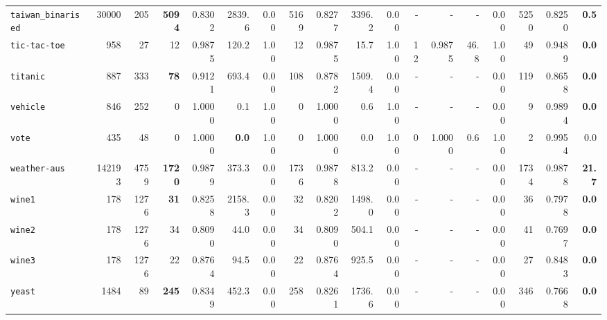 \begin{tabular}{lccrrrrrrrrrrrrrrr}
\texttt{taiwan\_binarised} & \multicolumn{1}{r}{30000} & \multicolumn{1}{r}{205}  & \textbf{5094} & 0.8302 & 2839.6 & 0.00 & 5169 & 0.8277 & 3396.2 & 0.00 & - & - & - & 0.00 & 5250 & 0.8250 & \textbf{0.5}\\
\texttt{tic-tac-toe} & \multicolumn{1}{r}{958} & \multicolumn{1}{r}{27}  & 12 & 0.9875 & 120.2 & 1.00 & 12 & 0.9875 & 15.7 & 1.00 & 12 & 0.9875 & 46.8 & 1.00 & 49 & 0.9489 & \textbf{0.0}\\
\texttt{titanic} & \multicolumn{1}{r}{887} & \multicolumn{1}{r}{333}  & \textbf{78} & 0.9121 & 693.4 & 0.00 & 108 & 0.8782 & 1509.4 & 0.00 & - & - & - & 0.00 & 119 & 0.8658 & \textbf{0.0}\\
\texttt{vehicle} & \multicolumn{1}{r}{846} & \multicolumn{1}{r}{252}  & 0 & 1.0000 & 0.1 & 1.00 & 0 & 1.0000 & 0.6 & 1.00 & - & - & - & 0.00 & 9 & 0.9894 & \textbf{0.0}\\
\texttt{vote} & \multicolumn{1}{r}{435} & \multicolumn{1}{r}{48}  & 0 & 1.0000 & \textbf{0.0} & 1.00 & 0 & 1.0000 & 0.0 & 1.00 & 0 & 1.0000 & 0.6 & 1.00 & 2 & 0.9954 & 0.0\\
\texttt{weather-aus} & \multicolumn{1}{r}{142193} & \multicolumn{1}{r}{4759}  & \textbf{1720} & 0.9879 & 373.3 & 0.00 & 1736 & 0.9878 & 813.2 & 0.00 & - & - & - & 0.00 & 1734 & 0.9878 & \textbf{21.7}\\
\texttt{wine1} & \multicolumn{1}{r}{178} & \multicolumn{1}{r}{1276}  & \textbf{31} & 0.8258 & 2158.3 & 0.00 & 32 & 0.8202 & 1498.0 & 0.00 & - & - & - & 0.00 & 36 & 0.7978 & \textbf{0.0}\\
\texttt{wine2} & \multicolumn{1}{r}{178} & \multicolumn{1}{r}{1276}  & 34 & 0.8090 & 44.0 & 0.00 & 34 & 0.8090 & 504.1 & 0.00 & - & - & - & 0.00 & 41 & 0.7697 & \textbf{0.0}\\
\texttt{wine3} & \multicolumn{1}{r}{178} & \multicolumn{1}{r}{1276}  & 22 & 0.8764 & 94.5 & 0.00 & 22 & 0.8764 & 925.5 & 0.00 & - & - & - & 0.00 & 27 & 0.8483 & \textbf{0.0}\\
\texttt{yeast} & \multicolumn{1}{r}{1484} & \multicolumn{1}{r}{89}  & \textbf{245} & 0.8349 & 452.3 & 0.00 & 258 & 0.8261 & 1736.6 & 0.00 & - & - & - & 0.00 & 346 & 0.7668 & \textbf{0.0}\\
\bottomrule
\end{tabular}
